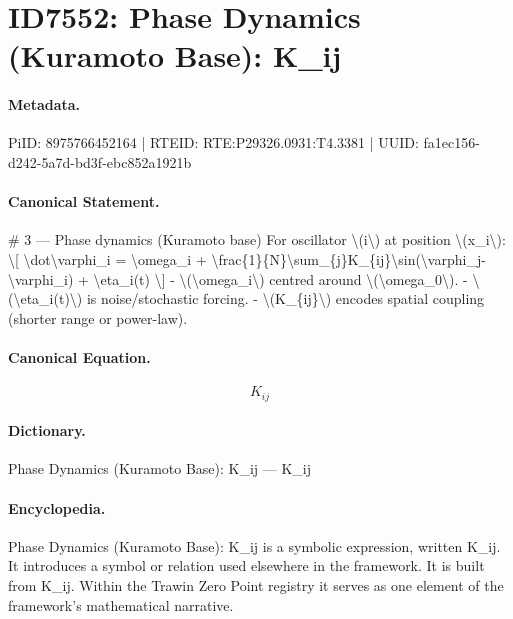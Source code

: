 \section*{ID7552: Phase Dynamics (Kuramoto Base): K\_ij}
\paragraph{Metadata.}
PiID: 8975766452164 | RTEID: RTE:P29326.0931:T4.3381 | UUID: fa1ec156-d242-5a7d-bd3f-ebc852a1921b

\paragraph{Canonical Statement.}
\# 3 — Phase dynamics (Kuramoto base) For oscillator \textbackslash{}(i\textbackslash{}) at position \textbackslash{}(x\_i\textbackslash{}): \textbackslash{}[ \textbackslash{}dot\textbackslash{}varphi\_i = \textbackslash{}omega\_i + \textbackslash{}frac\{1\}\{N\}\textbackslash{}sum\_\{j\}K\_\{ij\}\textbackslash{}sin(\textbackslash{}varphi\_j-\textbackslash{}varphi\_i) + \textbackslash{}eta\_i(t) \textbackslash{}] - \textbackslash{}(\textbackslash{}omega\_i\textbackslash{}) centred around \textbackslash{}(\textbackslash{}omega\_0\textbackslash{}). - \textbackslash{}(\textbackslash{}eta\_i(t)\textbackslash{}) is noise/stochastic forcing. - \textbackslash{}(K\_\{ij\}\textbackslash{}) encodes spatial coupling (shorter range or power-law).

\paragraph{Canonical Equation.}
\[
K_{ij}
\]

\paragraph{Dictionary.}
Phase Dynamics (Kuramoto Base): K\_ij — K\_ij

\paragraph{Encyclopedia.}
Phase Dynamics (Kuramoto Base): K\_ij is a symbolic expression, written K\_ij. It introduces a symbol or relation used elsewhere in the framework. It is built from K\_ij. Within the Trawin Zero Point registry it serves as one element of the framework's mathematical narrative.
